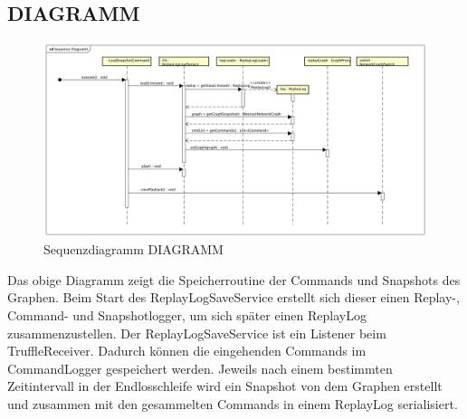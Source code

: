 \subsection{DIAGRAMM}
\begin{figure}
  \centering
  \includegraphics[width=\textwidth]{../diagramimages/sd_loadsnapshot.png}
  \caption[Sequenzdiagramm DIAGRAMM]{Sequenzdiagramm DIAGRAMM}
\end{figure}

 Das obige Diagramm zeigt die Speicherroutine der Commands und Snapshots des Graphen. Beim Start des ReplayLogSaveService erstellt sich dieser einen Replay-, Command- und Snapshotlogger, um sich später einen ReplayLog zusammenzustellen. Der ReplayLogSaveService ist ein Listener beim TruffleReceiver. Dadurch können die eingehenden Commands im CommandLogger gespeichert werden. Jeweils nach einem bestimmten Zeitintervall in der Endlosschleife wird ein Snapshot von dem Graphen erstellt und zusammen mit den gesammelten Commands in einem ReplayLog serialisiert.